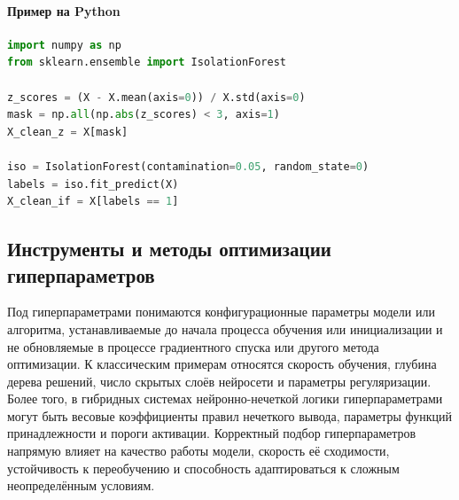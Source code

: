 \paragraph{Пример на Python}
\begin{lstlisting}[language=Python]
import numpy as np
from sklearn.ensemble import IsolationForest

z_scores = (X - X.mean(axis=0)) / X.std(axis=0)
mask = np.all(np.abs(z_scores) < 3, axis=1)
X_clean_z = X[mask]

iso = IsolationForest(contamination=0.05, random_state=0)
labels = iso.fit_predict(X)
X_clean_if = X[labels == 1]
\end{lstlisting}

%
\subsection{Инструменты и методы оптимизации гиперпараметров}
\label{sec:hyperparameter-optimization}

Под гиперпараметрами понимаются конфигурационные параметры модели или алгоритма, устанавливаемые до начала процесса обучения или инициализации и не обновляемые в процессе градиентного спуска или другого метода оптимизации. К классическим примерам относятся скорость обучения, глубина дерева решений, число скрытых слоёв нейросети и параметры регуляризации. Более того, в гибридных системах нейронно-нечеткой логики гиперпараметрами могут быть весовые коэффициенты правил нечеткого вывода, параметры функций принадлежности и пороги активации. Корректный подбор гиперпараметров напрямую влияет на качество работы модели, скорость её сходимости, устойчивость к переобучению и способность адаптироваться к сложным неопределённым условиям.

